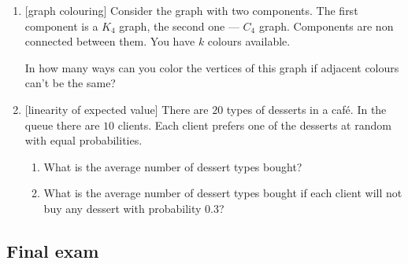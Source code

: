 \documentclass[12pt]{article}
\begin{document}
\begin{enumerate}
    How many triangular faces are there?

    \item {[graph colouring]} Consider the graph with two components. The first component is a $K_4$ graph, the second one — $C_4$ graph. 
    Components are non connected between them. You have $k$ colours available.

    In how many ways can you color the vertices of this graph if adjacent colours can't be the same?
    
    
    \item {[linearity of expected value]} There are $20$ types of desserts in a café. In the queue there are $10$ clients.
Each client prefers one of the desserts at random with equal probabilities.

\begin{enumerate}[label=\alph*)]
  \item What is the average number of dessert types bought?
  \item What is the average number of dessert types bought if each client will not buy any dessert with probability $0.3$?
\end{enumerate}

\end{enumerate}



\subsection*{Final exam}
\end{document}
